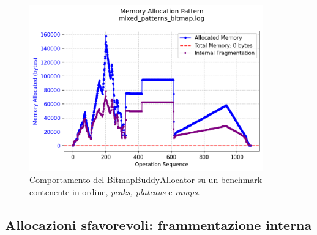 \begin{figure}[H]
  \centering
  \includegraphics[width=0.9\textwidth]{graphs/mixed_patterns_bitmap.png}
  \caption{Comportamento del BitmapBuddyAllocator su un benchmark contenente in ordine, \textit{peaks, plateaus} e \textit{ramps}.}
  \label{fig:mixed_patterns_bitmap}
\end{figure}

\subsection{Allocazioni sfavorevoli: frammentazione interna}

